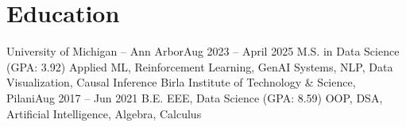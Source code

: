 

\section{Education}
\vspace{-10pt}
\resumeSubheadingEducation
  {University of Michigan – Ann Arbor}{Aug 2023 -- April 2025}
  {M.S. in Data Science (GPA: 3.92)}
  {Applied ML, Reinforcement Learning, GenAI Systems, NLP, Data Visualization, Causal Inference}
\resumeSubheadingEducation
  {Birla Institute of Technology \& Science, Pilani}{Aug 2017 -- Jun 2021}
  {B.E. EEE, Data Science (GPA: 8.59)}
  {OOP, DSA, Artificial Intelligence, Algebra, Calculus}

